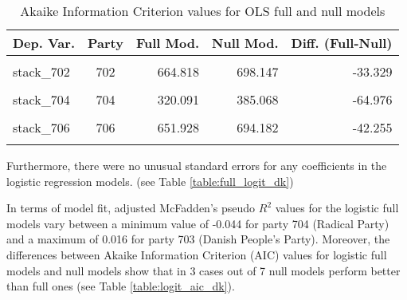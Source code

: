 \documentclass[
]{article}
\begin{document}
\begin{table}[!h]

\caption{\label{tab:unnamed-chunk-47}Akaike Information Criterion values for OLS full and null models 
        \label{table:ols_aic_dk}}
\centering
\begin{tabular}[t]{lcrrr}
\toprule
Dep. Var. & Party & Full Mod. & Null Mod. & Diff. (Full-Null)\\
\midrule
\cellcolor{gray!6}{stack\_701} & \cellcolor{gray!6}{701} & \cellcolor{gray!6}{600.463} & \cellcolor{gray!6}{650.130} & \cellcolor{gray!6}{-49.667}\\
stack\_702 & 702 & 664.818 & 698.147 & -33.329\\
\cellcolor{gray!6}{stack\_703} & \cellcolor{gray!6}{703} & \cellcolor{gray!6}{708.256} & \cellcolor{gray!6}{702.351} & \cellcolor{gray!6}{5.905}\\
stack\_704 & 704 & 320.091 & 385.068 & -64.976\\
\cellcolor{gray!6}{stack\_705} & \cellcolor{gray!6}{705} & \cellcolor{gray!6}{604.462} & \cellcolor{gray!6}{637.521} & \cellcolor{gray!6}{-33.060}\\
\addlinespace
stack\_706 & 706 & 651.928 & 694.182 & -42.255\\
\cellcolor{gray!6}{stack\_707} & \cellcolor{gray!6}{707} & \cellcolor{gray!6}{363.465} & \cellcolor{gray!6}{431.607} & \cellcolor{gray!6}{-68.141}\\
\bottomrule
\end{tabular}
\end{table}

Furthermore, there were no unusual standard errors for any coefficients in the logistic regression models. (see Table \ref{table:full_logit_dk})

In terms of model fit, adjusted McFadden's pseudo \(R^2\) values for the logistic full models vary between
a minimum value of
-0.044
for party 704
(Radical Party)
and a maximum of
0.016
for party 703
(Danish People's Party).
Moreover, the differences between Akaike Information Criterion (AIC) values for logistic full models and
null models show that in 3 cases out of 7 null models perform better than full ones (see Table
\ref{table:logit_aic_dk}).
\end{document}
